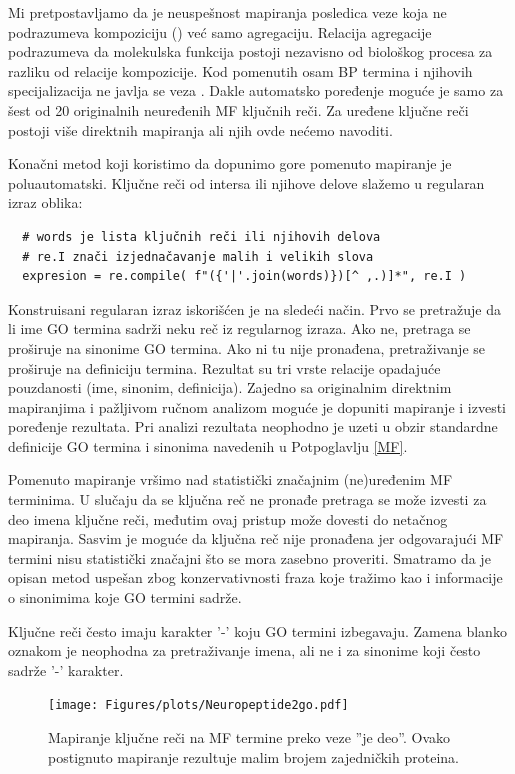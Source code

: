 Mi pretpostavljamo da je neuspešnost mapiranja posledica veze  koja ne
podrazumeva kompoziciju () već samo agregaciju. Relacija
agregacije podrazumeva da molekulska funkcija postoji nezavisno od biološkog
procesa za razliku od relacije kompozicije. Kod pomenutih osam BP termina i njihovih
specijalizacija ne javlja se veza .
Dakle automatsko poređenje moguće je samo za šest od 20 originalnih neuređenih MF 
ključnih reči. Za uređene ključne reči postoji više direktnih mapiranja ali njih
ovde nećemo navoditi.

Konačni metod koji koristimo da dopunimo gore pomenuto mapiranje je
poluautomatski. Ključne reči od intersa ili njihove delove slažemo u 
regularan izraz oblika:
\begin{verbatim}
  # words je lista ključnih reči ili njihovih delova
  # re.I znači izjednačavanje malih i velikih slova
  expresion = re.compile( f"({'|'.join(words)})[^ ,.)]*", re.I )
\end{verbatim}
Konstruisani regularan izraz iskorišćen je na sledeći način. Prvo se pretražuje
da li ime GO termina sadrži neku reč iz regularnog izraza. Ako ne, pretraga se
proširuje na  sinonime GO termina. Ako ni tu nije pronađena, pretraživanje se
proširuje na definiciju termina. Rezultat su tri vrste relacije opadajuće
pouzdanosti (ime, sinonim, definicija). Zajedno sa originalnim direktnim
mapiranjima i pažljivom ručnom analizom moguće je dopuniti mapiranje i izvesti
poređenje rezultata. Pri analizi rezultata neophodno je uzeti u obzir
standardne definicije GO termina i sinonima navedenih u Potpoglavlju \ref{MF}.

Pomenuto mapiranje vršimo nad statistički značajnim (ne)uređenim MF
terminima.  U slučaju da se ključna reč ne pronađe pretraga se može izvesti za
deo imena ključne reči, međutim ovaj pristup može dovesti do netačnog
mapiranja. Sasvim je moguće da ključna reč nije pronađena jer odgovarajući MF
termini nisu statistički značajni što se mora zasebno proveriti. Smatramo da je
opisan metod uspešan zbog konzervativnosti fraza koje tražimo kao i informacije
o sinonimima koje GO termini sadrže.

Ključne reči često imaju karakter '-' koju GO termini izbegavaju. Zamena blanko
oznakom je neophodna za pretraživanje imena, ali ne i za sinonime koji često
sadrže '-' karakter. 


\begin{figure}[th]
\centering
\hspace*{-1.0cm} 
\texttt{[image: Figures/plots/Neuropeptide2go.pdf]}
\decoRule
\caption {
  Mapiranje ključne reči  na MF termine preko veze ''je deo''.
  Ovako postignuto mapiranje rezultuje malim brojem zajedničkih proteina.
}
\label{fig:neuropeptide}
\end{figure}
